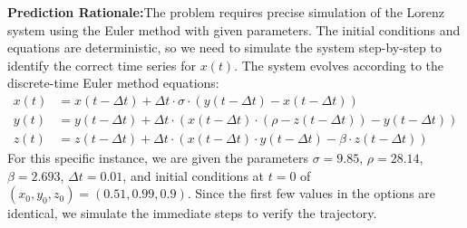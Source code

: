 \begin{ReasoningBox}[title=Reasoning Error]
    \vspace{0.3em}

    \textbf{Prediction Rationale:}The problem requires precise simulation of the Lorenz system using the Euler method with given parameters. The initial conditions and equations are deterministic, so we need to simulate the system step-by-step to identify the correct time series for $x(t)$. The system evolves according to the discrete-time Euler method equations:
\begin{align*}
    x(t) &= x(t-\Delta t) + \Delta t \cdot \sigma \cdot (y(t-\Delta t) - x(t-\Delta t)) \\
    y(t) &= y(t-\Delta t) + \Delta t \cdot (x(t-\Delta t) \cdot (\rho - z(t-\Delta t)) - y(t-\Delta t)) \\
    z(t) &= z(t-\Delta t) + \Delta t \cdot (x(t-\Delta t) \cdot y(t-\Delta t) - \beta \cdot z(t-\Delta t))
\end{align*}
For this specific instance, we are given the parameters $\sigma = 9.85$, $\rho = 28.14$, $\beta = 2.693$, $\Delta t = 0.01$, and initial conditions at $t=0$ of $(x_0, y_0, z_0) = (0.51, 0.99, 0.9)$. Since the first few values in the options are identical, we simulate the immediate steps to verify the trajectory. 


\end{ReasoningBox}
